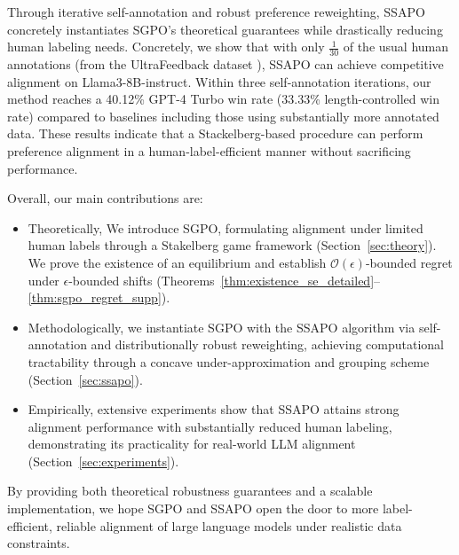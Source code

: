 Through iterative self-annotation and robust preference reweighting, SSAPO concretely instantiates SGPO’s theoretical guarantees while drastically reducing human labeling needs. Concretely, we show that with only $\tfrac{1}{30}$ of the usual human annotations (from the UltraFeedback dataset \citet{Cui2023Ultrafeedback}), SSAPO can achieve competitive alignment on Llama3-8B-instruct. Within three self-annotation iterations, our method reaches a 40.12\% GPT-4 Turbo win rate (33.33\% length-controlled win rate) compared to baselines including those using substantially more annotated data. These results indicate that a Stackelberg-based procedure can perform preference alignment in a human-label-efficient manner without sacrificing performance.

Overall, our main contributions are: 
\begin{itemize}
    \item Theoretically,  We introduce SGPO, formulating alignment under limited human labels through a Stakelberg game framework (Section~\ref{sec:theory}). We prove the existence of an equilibrium and establish $\mathcal{O}(\epsilon)$-bounded regret under $\epsilon$-bounded shifts (Theorems~\ref{thm:existence_se_detailed}--\ref{thm:sgpo_regret_supp}).
    \item Methodologically, we instantiate SGPO with the SSAPO algorithm via self-annotation and distributionally robust reweighting, achieving computational tractability through a concave under-approximation and grouping scheme (Section~\ref{sec:ssapo}).
    \item Empirically, extensive experiments show that SSAPO attains strong alignment performance with substantially reduced human labeling, demonstrating its practicality for real-world LLM alignment (Section~\ref{sec:experiments}).
\end{itemize}

By providing both theoretical robustness guarantees and a scalable implementation, we hope SGPO and SSAPO open the door to more label-efficient, reliable alignment of large language models under realistic data constraints.

